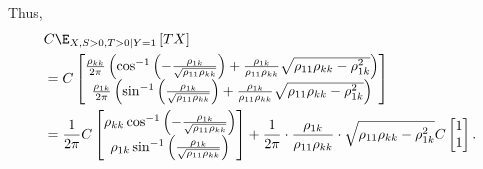 \documentclass{article}
\begin{document}
Thus,
\begin{align}
  & C \E_{X, S > 0, T > 0 \mid Y=1} \left[ T X \right] \\
  &= C \begin{bmatrix}
    \frac{\rho_{kk}}{2\pi}\left(\cos^{-1}\left(-\frac{\rho_{1k}}{\sqrt{\rho_{11}\rho_{kk}}}\right)+\frac{\rho_{1k}}{\rho_{11}\rho_{kk}}\sqrt{\rho_{11}\rho_{kk}-\rho_{1k}^{2}}\right) \\
    \frac{\rho_{1k}}{2\pi}\left(\sin^{-1}\left(\frac{\rho_{1k}}{\sqrt{\rho_{11}\rho_{kk}}}\right)+\frac{\rho_{1k}}{\rho_{11}\rho_{kk}}\sqrt{\rho_{11}\rho_{kk}-\rho_{1k}^{2}}\right)
  \end{bmatrix} \\
  &= \frac{1}{2\pi} C \begin{bmatrix}
    \rho_{kk} \cos^{-1}\left(-\frac{\rho_{1k}}{\sqrt{\rho_{11}\rho_{kk}}}\right) \\
    \rho_{1k} \sin^{-1}\left(\frac{\rho_{1k}}{\sqrt{\rho_{11}\rho_{kk}}}\right)
  \end{bmatrix}
  + \frac{1}{2\pi} \cdot \frac{\rho_{1k}}{\rho_{11}\rho_{kk}} \cdot \sqrt{\rho_{11}\rho_{kk}-\rho_{1k}^{2}}
  C \begin{bmatrix}
    1 \\ 1
  \end{bmatrix}. %
\end{align}
\end{document}
